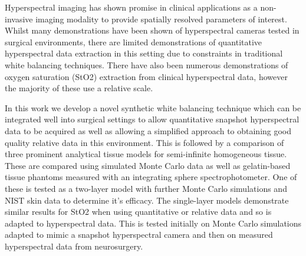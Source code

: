 Hyperspectral imaging has shown promise in clinical applications as a non-invasive imaging modality to provide spatially resolved parameters of interest. Whilst many demonstrations have been shown of hyperspectral cameras tested in surgical environments, there are limited demonstrations of quantitative hyperspectral data extraction in this setting due to constraints in traditional white balancing techniques. There have also been numerous demonstrations of oxygen saturation (StO2) extraction from clinical hyperspectral data, however the majority of these use a relative scale.

In this work we develop a novel synthetic white balancing technique which can be integrated well into surgical settings to allow quantitative snapshot hyperspectral data to be acquired as well as allowing a simplified approach to obtaining good quality relative data in this environment. This is followed by a comparison of three prominent analytical tissue models for semi-infinite homogeneous tissue. These are compared using simulated Monte Carlo data as well as gelatin-based tissue phantoms measured with an integrating sphere spectrophotometer. One of these is tested as a two-layer model with further Monte Carlo simulations and NIST skin data to determine it’s efficacy. The single-layer models demonstrate similar results for StO2 when using quantitative or relative data and so is adapted to hyperspectral data. This is tested initially on Monte Carlo simulations adapted to mimic a snapshot hyperspectral camera and then on measured hyperspectral data from neurosurgery.